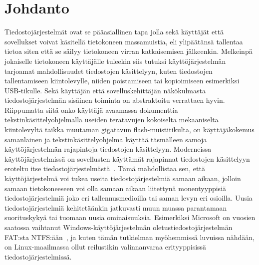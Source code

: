 \section{Johdanto}

Tiedostojärjestelmät ovat se pääasiallinen tapa jolla sekä käyttäjät että sovellukset voivat käsitellä tietokoneen massamuistia,
eli ylipäätänsä tallentaa tietoa siten että se säilyy tietokoneen virran katkaisemisen jälkeenkin.
Melkeinpä jokaiselle tietokoneen käyttäjälle tuleekin siis tutuksi käyttöjärjestelmän tarjoamat mahdollisuudet tiedostojen käsittelyyn,
kuten tiedostojen tallentamiseen kiintolevylle, niiden poistamiseen tai kopioimiseen esimerkiksi USB-tikulle.
Sekä käyttäjän että sovelluskehittäjän näkökulmasta tiedostojärjestelmän sisäinen toiminta on abstraktoitu verrattaen hyvin.
Riippumatta siitä onko käyttäjä avaamassa dokumenttia tekstinkäsittelyohjelmalla useiden teratavujen kokoiselta mekaaniselta kiintolevyltä taikka muutaman gigatavun flash-muistitikulta,
on käyttäjäkokemus samanlainen ja tekstinkäsittelyohjelma käyttää täsmälleen samoja käyttöjärjestelmän rajapintoja tiedostojen käsittelyyn.
Moderneissa käyttöjärjestelmissä on sovellusten käyttämät rajapinnat tiedostojen käsittelyyn eroteltu itse tiedostojärjestelmästä~\cite{UnixFsBook}.
Tämä mahdollistaa sen, että käyttöjärjestelmä voi tukea useita tiedostojärjestelmiä samaan aikaan,
jolloin samaan tietokoneeseen voi olla samaan aikaan liitettynä monentyyppisiä tiedostojärjestelmiä joko eri tallennusmedioilla tai saman levyn eri osioilla.
Uusia tiedostojärjestelmiä kehitetäänkin jatkuvasti muun muassa parantamaan suorituskykyä tai tuomaan uusia ominaisuuksia.
Esimerkiksi Microsoft on vuosien saatossa vaihtanut Windows-käyttöjärjestelmän oletustiedostojärjestelmän FAT:sta NTFS:ään~\cite{BefsBook},
ja kuten tämän tutkielman myöhemmissä luvuissa nähdään,
on Linux-maailmassa ollut reilustikin valinnanvaraa erityyppisissä tiedostojärjestelmissä.

